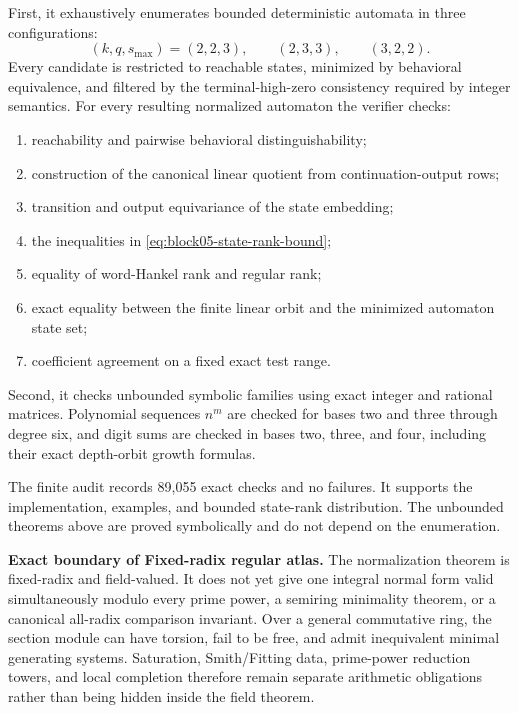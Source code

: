 \documentclass[11pt]{article}
\theoremstyle{definition}
\theoremstyle{remark}
\begin{document}
First, it exhaustively enumerates bounded deterministic automata in three configurations:
\[
(k,q,s_{\max})=(2,2,3),\qquad(2,3,3),\qquad(3,2,2).
\]
Every candidate is restricted to reachable states, minimized by behavioral equivalence, and filtered by the terminal-high-zero consistency required by integer semantics.  For every resulting normalized automaton the verifier checks:
\begin{enumerate}
\item reachability and pairwise behavioral distinguishability;
\item construction of the canonical linear quotient from continuation-output rows;
\item transition and output equivariance of the state embedding;
\item the inequalities in \cref{eq:block05-state-rank-bound};
\item equality of word-Hankel rank and regular rank;
\item exact equality between the finite linear orbit and the minimized automaton state set;
\item coefficient agreement on a fixed exact test range.
\end{enumerate}

Second, it checks unbounded symbolic families using exact integer and rational matrices.  Polynomial sequences \(n^m\) are checked for bases two and three through degree six, and digit sums are checked in bases two, three, and four, including their exact depth-orbit growth formulas.

The finite audit records 89,055 exact checks and no failures.  It supports the implementation, examples, and bounded state-rank distribution.  The unbounded theorems above are proved symbolically and do not depend on the enumeration.

\begin{boundarybox}
\textbf{Exact boundary of Fixed-radix regular atlas.}
The normalization theorem is fixed-radix and field-valued.  It does not yet give one integral normal form valid simultaneously modulo every prime power, a semiring minimality theorem, or a canonical all-radix comparison invariant.  Over a general commutative ring, the section module can have torsion, fail to be free, and admit inequivalent minimal generating systems.  Saturation, Smith/Fitting data, prime-power reduction towers, and local completion therefore remain separate arithmetic obligations rather than being hidden inside the field theorem.
\end{boundarybox}
\end{document}
